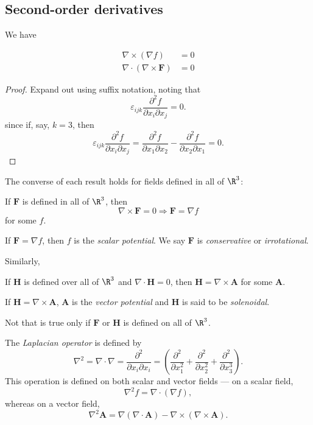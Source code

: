 \documentclass[a4paper]{article}
\begin{document}
\subsection{Second-order derivatives}
We have
\begin{prop}
  \begin{align*}
    \nabla\times (\nabla f) &= 0\\
    \nabla\cdot (\nabla\times \mathbf{F}) &=0
  \end{align*}
\end{prop}

\begin{proof}
  Expand out using suffix notation, noting that
  \[
    \varepsilon_{ijk}\frac{\partial^2 f}{\partial x_i \partial x_j} = 0.
  \]
  since if, say, $k = 3$, then
  \[
    \varepsilon_{ijk}\frac{\partial^2 f}{\partial x_i \partial x_j} = \frac{\partial^2 f}{\partial x_1 \partial x_2} - \frac{\partial^2 f}{\partial x_2 \partial x_1} = 0.
  \]

\end{proof}

The converse of each result holds for fields defined in all of $\R^3$:
\begin{prop}
  If $\mathbf{F}$ is defined in all of $\R^3$, then
  \[
    \nabla\times \mathbf{F} = 0 \Rightarrow \mathbf{F} = \nabla f
  \]
  for some $f$.
\end{prop}

\begin{defi}
  If $\mathbf{F} = \nabla f$, then $f$ is the \emph{scalar potential}. We say $\mathbf{F}$ is \emph{conservative} or \emph{irrotational}.
\end{defi}
Similarly,
\begin{prop}
  If $\mathbf{H}$ is defined over all of $\R^3$ and $\nabla\cdot \mathbf{H} = 0$, then $\mathbf{H} = \nabla \times \mathbf{A}$ for some $\mathbf{A}$.
\end{prop}

\begin{defi}
  If $\mathbf{H} = \nabla \times \mathbf{A}$, $\mathbf{A}$ is the \emph{vector potential} and $\mathbf{H}$ is said to be \emph{solenoidal}.
\end{defi}

Not that is true only if $\mathbf{F}$ or $\mathbf{H}$ is defined on all of $\R^3$.

\begin{defi}
  The \emph{Laplacian operator} is defined by
  \[
    \nabla^2 = \nabla\cdot \nabla = \frac{\partial^2}{\partial x_i \partial x_i} = \left(\frac{\partial^2}{\partial x_1^2} + \frac{\partial^2}{\partial x_2^2} + \frac{\partial^2}{\partial x_3^3}\right).
  \]
  This operation is defined on both scalar and vector fields --- on a scalar field,
  \[
    \nabla^2 f = \nabla\cdot (\nabla f),
  \]
  whereas on a vector field,
  \[
    \nabla^2 \mathbf{A} = \nabla(\nabla\cdot \mathbf{A}) - \nabla\times (\nabla\times \mathbf{A}).
  \]
\end{defi}
\end{document}
